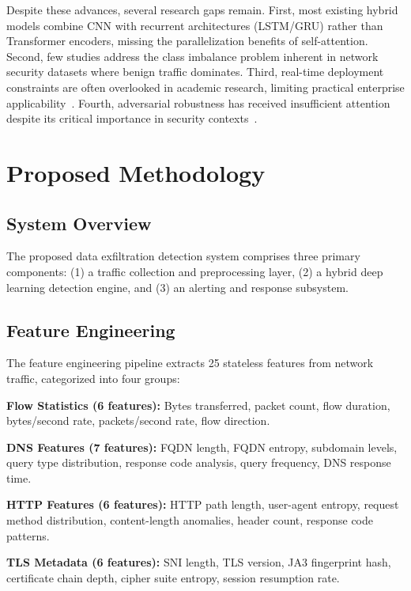 \documentclass[conference]{IEEEtran}
\begin{document}
Despite these advances, several research gaps remain. First, most existing hybrid models combine CNN with recurrent architectures (LSTM/GRU) rather than Transformer encoders, missing the parallelization benefits of self-attention. Second, few studies address the class imbalance problem inherent in network security datasets where benign traffic dominates. Third, real-time deployment constraints are often overlooked in academic research, limiting practical enterprise applicability~\cite{miller2022enterprise}. Fourth, adversarial robustness has received insufficient attention despite its critical importance in security contexts~\cite{patel2023behavioral}.

\section{Proposed Methodology}
\label{sec:methodology}

\subsection{System Overview}

The proposed data exfiltration detection system comprises three primary components: (1) a traffic collection and preprocessing layer, (2) a hybrid deep learning detection engine, and (3) an alerting and response subsystem.

\subsection{Feature Engineering}

The feature engineering pipeline extracts 25 stateless features from network traffic, categorized into four groups:

\textbf{Flow Statistics (6 features):} Bytes transferred, packet count, flow duration, bytes/second rate, packets/second rate, flow direction.

\textbf{DNS Features (7 features):} FQDN length, FQDN entropy, subdomain levels, query type distribution, response code analysis, query frequency, DNS response time.

\textbf{HTTP Features (6 features):} HTTP path length, user-agent entropy, request method distribution, content-length anomalies, header count, response code patterns.

\textbf{TLS Metadata (6 features):} SNI length, TLS version, JA3 fingerprint hash, certificate chain depth, cipher suite entropy, session resumption rate.
\end{document}
